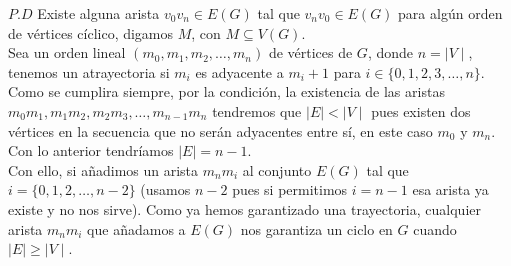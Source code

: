 \documentclass[12pt]{article}
\begin{document}
$P.D$ Existe alguna arista $v_0 v_n \in E(G)$ tal que $v_n v_0 \in E(G)$ para algún orden de vértices cíclico, digamos $M$, con $M \subseteq V(G)$.\\

Sea un orden lineal $(m_0, m_1, m_2, \dots , m_n)$ de vértices de $G$, donde $n = \mid V \mid$, tenemos un atrayectoria si $m_i$ es adyacente a $m_i+1$
para $i \in \{0, 1, 2, 3, \dots, n\}$.\\

Como se cumplira siempre, por la condición, la existencia de las aristas $m_0 m_1, m_1 m_2, m_2 m_3, \dots , m_{n-1} m_n$ tendremos que 
$\mid E \mid < \mid V \mid$ pues existen dos vértices en la secuencia que no serán adyacentes entre sí, en este caso $m_0$ y $m_n$. Con lo anterior 
tendríamos $\mid E \mid = n - 1$.\\

Con ello, si añadimos un arista $m_n m_i$ al conjunto $E(G)$ tal que $i = \{0, 1, 2, \dots, n-2\}$ (usamos $n-2$ pues si permitimos $i = n-1$ esa arista ya existe y no nos sirve).
Como ya hemos garantizado una trayectoria, cualquier arista $m_n m_i$ que añadamos a $E(G)$ nos garantiza un ciclo en $G$ cuando $\mid E \mid \geq \mid V \mid$.
\end{document}
